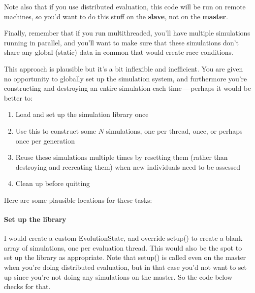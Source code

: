 \documentclass[twoside,10pt]{book}
\newcommand\method[1]{\index{#1}\textsf{#1}}
\begin{document}
Note also that if you use distributed evaluation, this code will be run on remote machines, so you'd want to do this stuff on the {\bf slave}, not on the {\bf master}.

Finally, remember that if you run multithreaded, you'll have multiple simulations running in parallel, and you'll want to make sure that these simulations don't share any global (static) data in common that would create race conditions.

This approach is plausible but it's a bit inflexible and inefficient.  You are given no opportunity to globally set up the simulation system, and furthermore you're constructing and destroying an entire simulation each time\,---\,perhaps it would be better to:

\begin{enumerate}
\item Load and set up the simulation library once
\item Use this to construct some \(N\) simulations, one per thread, once, or perhaps once per generation
\item Reuse these simulations multiple times by resetting them (rather than destroying and recreating them) when new individuals need to be assessed
\item Clean up before quitting
\end{enumerate}

Here are some plausible locations for these tasks:
 
\paragraph{Set up the library}

I would create a custom EvolutionState, and override \method{setup()} to create a blank array of simulations, one per evaluation thread.  This would also be the spot to set up the library as appropriate.  Note that \method{setup()} is called even on the master when you're doing distributed evaluation, but in that case you'd not want to set up since you're not doing any simulations on the master.  So the code below checks for that.
\end{document}
